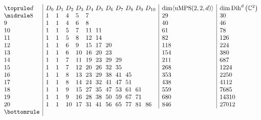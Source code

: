 \documentclass[pdftex]{sigma}
\numberwithin{equation}{section}
\newcommand{\CC}{\mathbb{C}}
\DeclareMathOperator{\uMPS}{uMPS}
\DeclareMathOperator{\Dih}{Dih}
\begin{document}
 \begin{table}[th]\centering
	\caption{Character of $\langle \uMPS(2,2,d) \rangle$. Since $D_{w}=D_{d-w}$ (more generally: for every ${\rm GL}_2$-re\-pre\-sen\-tation~$V$ we have that $V_{(b_0,b_1)}=V_{(b_1,b_0)}$), we only list $D_w$ for $w \leq \big\lceil \frac{d}{2}\big\rceil$. The dimension of $\langle \uMPS(2,2,d) \rangle$ equals twice the sum of the $D_w$'s if $d$ is odd, and twice the sum of the $D_w$'s minus the last $D_w$ if $d$ is even.}\label{table:character}

\vspace{-5mm}

$$
	\begin{array}{@{\,}l|l@{\,\,}l@{\,\,}l@{\,\,}l@{\,\,}l@{\,\,}l@{\,\,}l@{\,\,}l@{\,\,}l@{\,\,}l@{\,\,}l|l|l@{\,}}
	\toprule
	d & D_0	& D_1 	& D_2 	& D_3 	& D_4 & D_5 & D_6 & D_7 & D_8 & D_9 & D_{10} &\dim \langle\uMPS(2,2,d)\rangle & \dim \Dih^d\big(\CC^2\big)\\
	\midrule
	8 & 1 	& 1 	& 4 	& 5 	& 7  	&  &   &  &  &&& 29 & 30\\
	9 & 1	& 1 	& 4 	& 6 	& 8  	&  &  & & &&& 40 & 46\\
	10 & 1 	& 1 	& 5 	& 7 	& 11 	& 11 &  & &   &  && 61 & 78\\
	11 &  1 & 1 	& 5 	& 8 	& 12 	& 14 &  & &   &  && 82 & 126\\
	12 &  1	& 1 	& 6 	& 9 	& 15 	& 17 & 20 &  &  &  && 118 & 224\\
	13 &  1	& 1 	& 6 	& 10 	& 16 	& 20 & 23 &  &  &  && 154 & 380\\
	14 & 1 	& 1 	& 7		& 11	& 19 	& 23 & 29 & 29&  &  && 211 & 687\\
	15 & 1 	& 1 	& 7		& 12 	& 20 	& 26 & 32 & 35&  &  && 268 & 1224\\
	16 & 1 	& 1 	& 8		& 13 	& 23 	& 29 & 38 &41 & 45 &  && 353 & 2250\\
	17 & 1  & 1     & 8     & 14    & 24    & 32 & 41 & 47 & 51  &  && 438 & 4112\\
	18 & 1  & 1     & 9     & 15    & 27    & 35 & 47 & 53 & 61 & 61 && 559 & 7685 \\
	19 & 1  & 1     & 9     & 16    & 28    & 38 & 50 & 59 & 67 & 71 && 680 & 14310 \\
    20 & 1  & 1     & 10    & 17    & 31    & 41 & 56 & 65 & 77 & 81 & 86 & 846 & 27012\\
	\bottomrule
	\end{array}$$
\vspace{-2mm}
\end{table}
\end{document}

